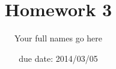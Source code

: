 
         \newcommand\alg[1]{\ensuremath{\mathbf{#1}}}
         \newcommand{\<}{\ensuremath{\langle}}
         \renewcommand{\>}{\ensuremath{\rangle}}
         \newcommand\fld[1]{\ensuremath{\mathbb{#1}}}
         \newcommand\Z{\fld{Z}}
         \newcommand\R{\fld{R}}
         \newcommand\C{\fld{C}}
         \newcommand\Q{\fld{Q}}
         \newcommand\N{\fld{N}}
         \newcommand\GF{\ensuremath{\operatorname{GF}}}
         \author{Your full names go here}
         \title{Homework 3}
         \date{due date: 2014/03/05}



